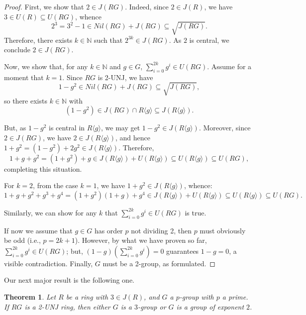 \documentclass[12pt]{amsart}
\newtheorem{theorem}{Theorem}[section]
\theoremstyle{definition}
\begin{document}
\begin{proof}
First, we show that $2 \in J(RG)$. Indeed, since $2 \in J(R)$, we have $3 \in U(R) \subseteq U(RG)$, whence $$2^3 = 3^2 - 1 \in Nil(RG) + J(RG) \subseteq \sqrt{J(RG)}.$$ Therefore, there exists $k \in \mathbb{N}$ such that $2^{3k} \in J(RG)$. As $2$ is central, we conclude $2 \in J(RG)$.

Now, we show that, for any $k \in \mathbb{N}$ and $g \in G$, $\sum_{i=0}^{2k}g^i \in U(RG)$. Assume for a moment that $k=1$. Since $RG$ is 2-UNJ, we have $$1-g^2 \in Nil(RG) + J(RG) \subseteq \sqrt{J(RG)},$$ so there exists $k \in \mathbb{N}$ with $$(1-g^2) \in J(RG) \cap R\langle g\rangle \subseteq J(R\langle g\rangle).$$

But, as $1-g^2$ is central in $R\langle g\rangle$, we may get $1-g^2 \in J(R\langle g\rangle)$. Moreover, since $2 \in J(RG)$, we have $2 \in J(R\langle g\rangle)$, and hence $1+g^2 = (1-g^2) + 2g^2 \in J(R\langle g\rangle)$. Therefore, $$1+g+g^2 = (1+g^2) + g \in J(R\langle g\rangle) + U(R\langle g\rangle) \subseteq U(R\langle g\rangle) \subseteq U(RG),$$ completing this situation.

For $k=2$, from the case $k=1$, we have $1+g^2 \in J(R\langle g\rangle)$, whence:
\[
1+g+g^2+g^3+g^4 = (1+g^2)(1+g) + g^4 \in J(R\langle g\rangle) + U(R\langle g\rangle) \subseteq U(R\langle g\rangle) \subseteq U(RG).
\]

Similarly, we can show for any $k$ that $\sum_{i=0}^{2k}g^i \in U(RG)$ is true.

If now we assume that $g \in G$ has order $p$ not dividing 2, then $p$ must obviously be odd (i.e., $p=2k+1$). However, by what we have proven so far, $\sum_{i=0}^{2k}g^i \in U(RG)$; but, $(1-g)\left(\sum_{i=0}^{2k}g^i\right) = 0$ guarantees $1-g=0$, a visible contradiction. Finally, $G$ must be a 2-group, as formulated.
\end{proof}

Our next major result is the following one.

\begin{theorem}
Let $R$ be a ring with $3 \in J(R)$, and $G$ a $p$-group with $p$ a prime. If $RG$ is a 2-UNJ ring, then either $G$ is a $3$-group or $G$ is a group of exponent $2$.
\end{theorem}
\end{document}
